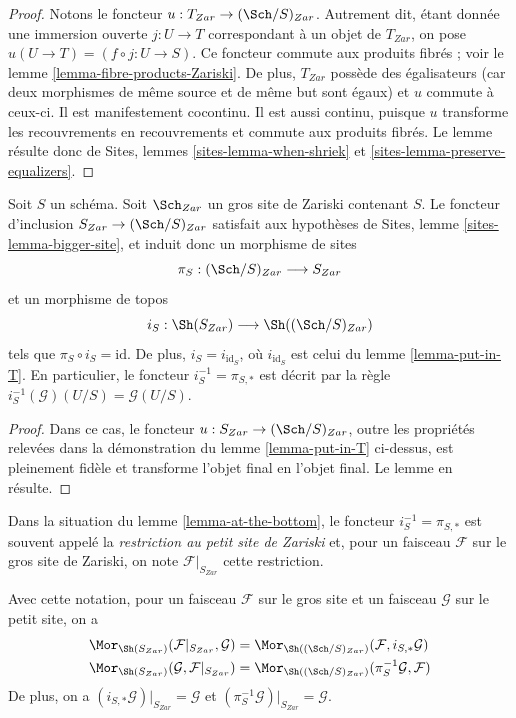 \begin{proof}
Notons le foncteur $u : T_{Zar} \to (\Sch/S)_{Zar}$.
Autrement dit, étant donnée une immersion ouverte $j : U \to T$ correspondant
à un objet de $T_{Zar}$, on pose $u(U \to T) = (f \circ j : U \to S)$.
Ce foncteur commute aux produits fibrés ; voir le
lemme \ref{lemma-fibre-products-Zariski}.
De plus, $T_{Zar}$ possède des égalisateurs (car deux morphismes de même
source et de même but sont égaux) et $u$ commute à ceux-ci.
Il est manifestement cocontinu.
Il est aussi continu, puisque $u$ transforme les recouvrements en recouvrements et
commute aux produits fibrés. Le lemme résulte donc de
Sites, lemmes \ref{sites-lemma-when-shriek}
et \ref{sites-lemma-preserve-equalizers}.
\end{proof}

\begin{lemma}
\label{lemma-at-the-bottom}
Soit $S$ un schéma. Soit $\Sch_{Zar}$ un gros site de Zariski
contenant $S$.
Le foncteur d'inclusion $S_{Zar} \to (\Sch/S)_{Zar}$
satisfait aux hypothèses de Sites, lemme \ref{sites-lemma-bigger-site},
et induit donc un morphisme de sites
$$
\pi_S : (\Sch/S)_{Zar} \longrightarrow S_{Zar}
$$
et un morphisme de topos
$$
i_S : \Sh(S_{Zar}) \longrightarrow \Sh((\Sch/S)_{Zar})
$$
tels que $\pi_S \circ i_S = \text{id}$. De plus, $i_S = i_{\text{id}_S}$,
où $i_{\text{id}_S}$ est celui du lemme \ref{lemma-put-in-T}. En particulier, le
foncteur $i_S^{-1} = \pi_{S, *}$ est décrit par la règle
$i_S^{-1}(\mathcal{G})(U/S) = \mathcal{G}(U/S)$.
\end{lemma}

\begin{proof}
Dans ce cas, le foncteur $u : S_{Zar} \to (\Sch/S)_{Zar}$,
outre les propriétés relevées dans la démonstration du
lemme \ref{lemma-put-in-T} ci-dessus, est pleinement fidèle
et transforme l'objet final en l'objet final.
Le lemme en résulte.
\end{proof}

\begin{definition}
\label{definition-restriction-small-zariski}
Dans la situation du
lemme \ref{lemma-at-the-bottom},
le foncteur $i_S^{-1} = \pi_{S, *}$ est souvent
appelé la {\it restriction au petit site de Zariski} et, pour un faisceau
$\mathcal{F}$ sur le gros site de Zariski, on note $\mathcal{F}|_{S_{Zar}}$
cette restriction.
\end{definition}

\noindent
Avec cette notation, pour un faisceau $\mathcal{F}$ sur le
gros site et un faisceau $\mathcal{G}$ sur le petit site, on a
\begin{align*}
\Mor_{\Sh(S_{Zar})}(\mathcal{F}|_{S_{Zar}}, \mathcal{G})
& =
\Mor_{\Sh((\Sch/S)_{Zar})}(\mathcal{F},
i_{S, *}\mathcal{G}) \\
\Mor_{\Sh(S_{Zar})}(\mathcal{G}, \mathcal{F}|_{S_{Zar}})
& =
\Mor_{\Sh((\Sch/S)_{Zar})}(\pi_S^{-1}\mathcal{G},
\mathcal{F})
\end{align*}
De plus, on a $(i_{S, *}\mathcal{G})|_{S_{Zar}} = \mathcal{G}$
et $(\pi_S^{-1}\mathcal{G})|_{S_{Zar}} = \mathcal{G}$.

